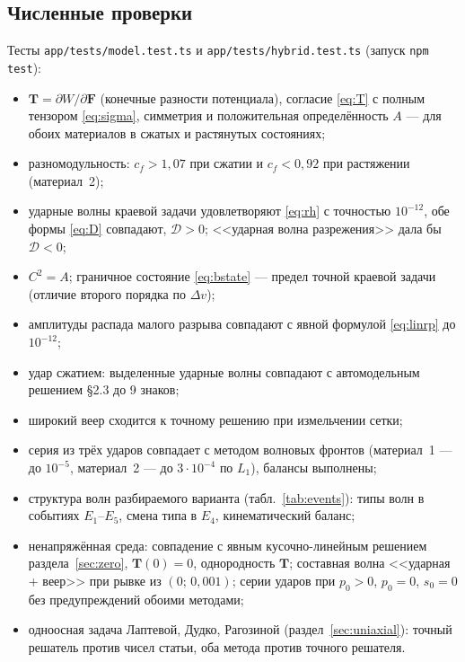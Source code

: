 \documentclass[11pt,a4paper]{article}
\theoremstyle{definition}
\theoremstyle{remark}
\newcommand{\bF}{\mathbf F}
\newcommand{\bT}{\mathbf T}
\begin{document}
\subsection{Численные проверки}
Тесты \texttt{app/tests/model.test.ts} и \texttt{app/tests/hybrid.test.ts} (запуск \texttt{npm test}):
\begin{itemize}
\item $\bT=\partial W/\partial\bF$ (конечные разности потенциала), согласие \eqref{eq:T} с полным
тензором \eqref{eq:sigma}, симметрия и положительная определённость $A$ --- для обоих материалов в
сжатых и растянутых состояниях;
\item разномодульность: $c_f>1{,}07$ при сжатии и $c_f<0{,}92$ при растяжении (материал~2);
\item ударные волны краевой задачи удовлетворяют \eqref{eq:rh} с точностью $10^{-12}$, обе формы
\eqref{eq:D} совпадают, $\mathcal D>0$; <<ударная волна разрежения>> дала бы $\mathcal D<0$;
\item $C^2=A$; граничное состояние \eqref{eq:bstate} --- предел точной краевой задачи (отличие второго
порядка по $\Delta v$);
\item амплитуды распада малого разрыва совпадают с явной формулой \eqref{eq:linrp} до $10^{-12}$;
\item удар сжатием: выделенные ударные волны совпадают с автомодельным решением §2.3 до 9 знаков;
\item широкий веер сходится к точному решению при измельчении сетки;
\item серия из трёх ударов совпадает с методом волновых фронтов (материал~1 --- до $10^{-5}$,
материал~2 --- до $3\cdot10^{-4}$ по $L_1$), балансы выполнены;
\item структура волн разбираемого варианта (табл.~\ref{tab:events}): типы волн в событиях
$E_1$--$E_5$, смена типа в $E_4$, кинематический баланс;
\item ненапряжённая среда: совпадение с явным кусочно-линейным решением раздела~\ref{sec:zero},
$\bT(0)=0$, однородность $\bT$; составная волна <<ударная + веер>> при рывке из $(0;\,0{,}001)$;
серии ударов при $p_0>0$, $p_0=0$, $s_0=0$ без предупреждений обоими методами;
\item одноосная задача Лаптевой, Дудко, Рагозиной (раздел~\ref{sec:uniaxial}): точный решатель против
чисел статьи, оба метода против точного решателя.
\end{itemize}
\end{document}
